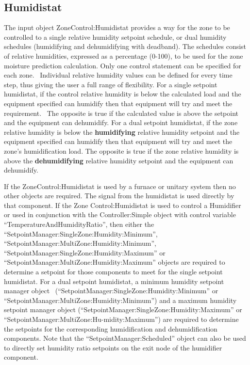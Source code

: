 \subsection{Humidistat}\label{humidistat}

The input object ZoneControl:Humidistat provides a way for the zone to be controlled to a single relative humidity setpoint schedule, or dual humidity schedules (humidifying and dehumidifying with deadband). The schedules consist of relative humidities, expressed as a percentage (0-100), to be used for the zone moisture prediction calculation. Only one control statement can be specified for each zone.~ Individual relative humidity values can be defined for every time step, thus giving the user a full range of flexibility. For a single setpoint humidistat, if the control relative humidity is below the calculated load and the equipment specified can humidify then that equipment will try and meet the requirement.~ The opposite is true if the calculated value is above the setpoint and the equipment can dehumidify. For a dual setpoint humidistat, if the zone relative humidity is below the \textbf{humidifying} relative humidity setpoint and the equipment specified can humidify then that equipment will try and meet the zone's humidification load. The opposite is true if the zone relative humidity is above the \textbf{dehumidifying} relative humidity setpoint and the equipment can dehumidify.

If the ZoneControl:Humidistat is used by a furnace or unitary system then no other objects are required. The signal from the humidistat is used directly by that component. If the Zone Control:Humidistat is used to control a Humidifier or used in conjunction with the Controller:Simple object with control variable ``TemperatureAndHumidityRatio'', then either the ``SetpointManager:SingleZone:Humidity:Minimum'', ``SetpointManager:MultiZone:Humidity:Minimum'',~ ``SetpointManager:SingleZone:Humidity:Maximum'' or ``SetpointManager:MultiZone:Humidity:Maximum'' objects are required to determine a setpoint for those components to meet for the single setpoint humidistat. For a dual setpoint humidistat, a minimum humidity setpoint manager object~ (``SetpointManager:SingleZone:Humidity:Minimum'' or ``SetpointManager:MultiZone:Humidity:Minimum'') and a maximum humidity setpoint manager object (``SetpointManager:SingleZone:Humidity:Maximum'' or ``SetpointManager:MultiZone:Hu-midity:Maximum'') are required to determine the setpoints for the corresponding humidification and dehumidification components. Note that the ``SetpointManager:Scheduled'' object can also be used to directly set humidity ratio setpoints on the exit node of the humidifier component.

